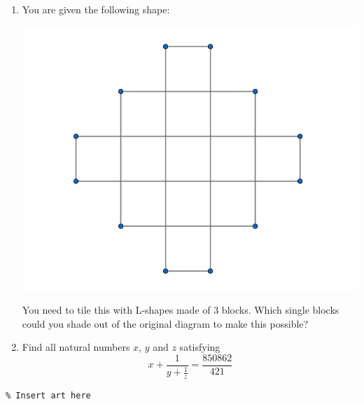 \begin{enumerate}[1.]
\item You are given the following shape: %
	\begin{center}
	\includegraphics[scale=0.3]{Capture.png}	
	\end{center}
	You need to tile this with L-shapes made of 3 blocks. Which single blocks could you shade out of the original diagram to make this possible?


\item %
Find all natural numbers $x$, $y$ and $z$ satisfying 
$$x + \frac{1}{y + \frac{1}{z}} = \frac{850862}{421}$$


\end{enumerate}


\vfill
\begin{center} \begin{verbatim}
% Insert art here
\end{verbatim} \end{center}


